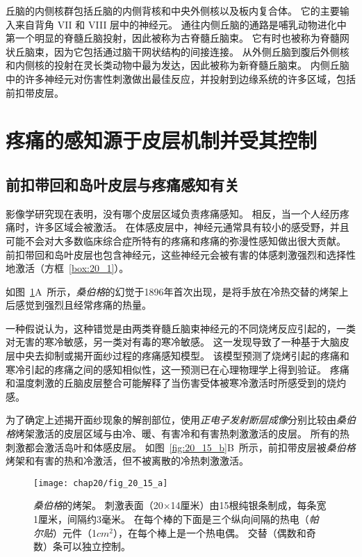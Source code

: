 丘脑的内侧核群包括丘脑的内侧背核和中央外侧核以及板内复合体。
它的主要输入来自背角 VII 和 VIII 层中的神经元。 
通往内侧丘脑的通路是哺乳动物进化中第一个明显的脊髓丘脑投射，因此被称为古脊髓丘脑束。
它有时也被称为脊髓网状丘脑束，因为它包括通过脑干网状结构的间接连接。
从外侧丘脑到腹后外侧核和内侧核的投射在灵长类动物中最为发达，因此被称为新脊髓丘脑束。
内侧丘脑中的许多神经元对伤害性刺激做出最佳反应，并投射到边缘系统的许多区域，包括前扣带皮层。



\section{疼痛的感知源于皮层机制并受其控制}

\subsection{前扣带回和岛叶皮层与疼痛感知有关}

影像学研究现在表明，没有哪个皮层区域负责疼痛感知。 
相反，当一个人经历疼痛时，许多区域会被激活。
在体感皮层中，神经元通常具有较小的感受野，并且可能不会对大多数临床综合症所特有的疼痛和疼痛的弥漫性感知做出很大贡献。
前扣带回和岛叶皮层也包含神经元，这些神经元会被有害的体感刺激强烈和选择性地激活（方框~\ref{box:20_1}）。


\begin{proposition}[大脑皮层幻觉疼痛的定位] \label{box:20_1}
	
	\quad \quad 如图~\ref{fig:20_15_a}A~所示，\textit{桑伯格}的幻觉于1896年首次出现，是将手放在冷热交替的烤架上后感觉到强烈且经常疼痛的热量。
	
	\quad \quad 一种假说认为，这种错觉是由两类脊髓丘脑束神经元的不同烧烤反应引起的，一类对无害的寒冷敏感，另一类对有毒的寒冷敏感。
	这一发现导致了一种基于大脑皮层中央去抑制或揭开面纱过程的疼痛感知模型。
	该模型预测了烧烤引起的疼痛和寒冷引起的疼痛之间的感知相似性，这一预测已在心理物理学上得到验证。
	疼痛和温度刺激的丘脑皮层整合可能解释了当伤害受体被寒冷激活时所感受到的烧灼感。
	
	\quad \quad 为了确定上述揭开面纱现象的解剖部位，使用\textit{正电子发射断层成像}分别比较由\textit{桑伯格}烤架激活的皮层区域与由冷、暖、有害冷和有害热刺激激活的皮层。
	所有的热刺激都会激活岛叶和体感皮层。
	如图~\ref{fig:20_15_b}B~所示，前扣带皮层被\textit{桑伯格}烤架和有害的热和冷激活，但不被离散的冷热刺激激活。
	
\end{proposition}


\begin{figure}[htbp]
	\centering
	\texttt{[image: chap20/fig\_20\_15\_a]}
	\caption{\textit{桑伯格}的烤架。
		刺激表面（20×14厘米）由15根纯银条制成，每条宽1厘米，间隔约3毫米。
		在每个棒的下面是三个纵向间隔的热电（\textit{帕尔贴}）元件（1$ cm^2 $），在每个棒上是一个热电偶。
		交替（偶数和奇数）条可以独立控制\cite{craig1994thermal}。}
	\label{fig:20_15_a}
\end{figure}


